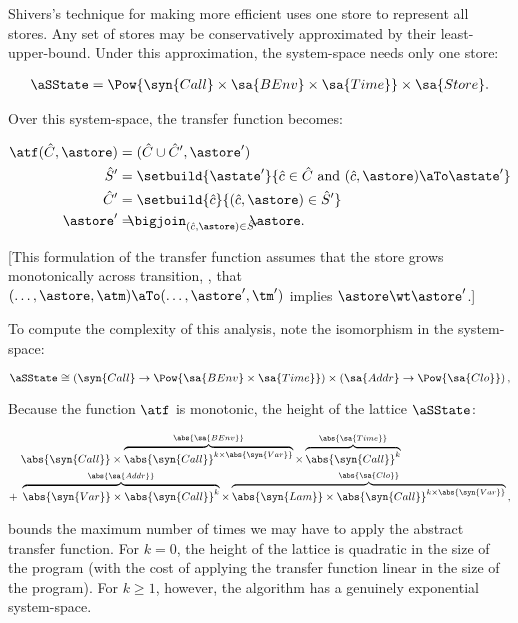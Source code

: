 Shivers's technique for making \kCFA{} more efficient uses one
store to represent all stores.
Any set of stores may be conservatively approximated by 
their least-upper-bound.
Under this approximation, the system-space needs only one
store:
\begin{small}\begin{align*}
  \aSState =
  \Pow{\syn{Call} \times \sa{BEnv} \times \sa{Time}} \times \sa{Store}
  \text.
\end{align*}\end{small}Over this system-space, the transfer function becomes:
\begin{small}\begin{align*}
  \atf(\hat C,\astore) &= (\hat C \cup \hat C', \astore')
  \\
  \hat S' &= \setbuild{ \astate' }{ \hat c \in \hat C \text{ and } (\hat c,\astore) \aTo \astate' }
  \\
  \hat C' &= \setbuild{ \hat c }{ (\hat c,\astore) \in \hat S' }
  \\
  \astore' &= \!\!\!\! \bigjoin_{ (\hat c,\astore) \in \hat S' } \!\!\!\! { \astore }
  \text.
\end{align*}\end{small}[This formulation of the transfer function assumes
that the store grows monotonically across transition, \ie, that
$(\ldots,\astore,\atm) \aTo (\ldots,\astore',\tm')$ implies $\astore
\wt \astore'$.]


To compute the complexity of this analysis, note the isomorphism in the system-space:
\begin{small}\begin{equation*}
  \aSState \cong
  \left(
    \syn{Call} \to \Pow{\sa{BEnv} \times \sa{Time}}\right)
  \times
  \left(
    \sa{Addr} \to \Pow{\sa{Clo}}
  \right)
  \text,
\end{equation*}\end{small}Because the function $\atf$ is monotonic, 
the height of the lattice $\aSState$:
\begin{small}\begin{align*}
  &
  \abs{\syn{Call}}
  \times
    \overbrace{
  \abs{\syn{Call}}^{k\times{\abs{\syn{Var}}}}
}^{\abs{\sa{BEnv}}}
  \times
  \overbrace{
  \abs{\syn{Call}}^k
  }^{\abs{\sa{Time}}}
  \\ 
  +\; &
  \overbrace{
  \abs{\syn{Var}} 
  \times 
  \abs{\syn{Call}}^k
  }^{\abs{\sa{Addr}}}
  \times
  \overbrace{
    \abs{\syn{Lam}}
    \times
    \abs{\syn{Call}}^{k \times {\abs{\syn{Var}}}}
  }^{\abs{\sa{Clo}}}
  \text,
\end{align*}\end{small}bounds the maximum number of times we may have to apply the
abstract transfer function. 
For $k = 0$, the height of the lattice is quadratic in the size of the
program (with the cost of applying the transfer function linear
in the size of the program).
For $k \geq 1$, however, the algorithm has a genuinely exponential
system-space.






